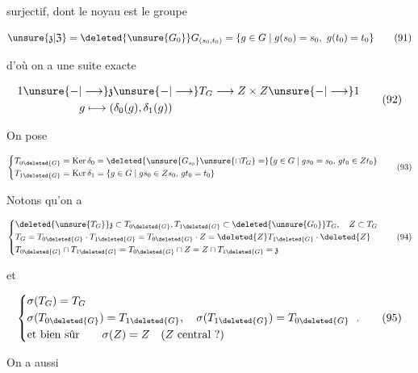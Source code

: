 
 surjectif, dont le noyau est le groupe

\[
\unsure{\mathfrak{z}|\mathfrak{Z}}=\deleted{\unsure{G_0}}G_{(s_0,t_0)}=\{g\in G\mid g(s_0)=s_0,\ g(t_0)=t_0\}\tag*{(91)}
\]


d'où on a une suite exacte

\[\begin{aligned}
1&\unsure{-|\longrightarrow}\mathfrak{z}\unsure{-|\longrightarrow}T_G\longrightarrow Z\times Z\unsure{-|\longrightarrow}1\\
&\hspace{5em}g\longmapsto(\delta_0(g),\delta_1(g))
\end{aligned}\tag*{(92)}\]

On pose

\[
\left\{\begin{aligned}
T_{0\deleted{G}}&=\operatorname{Ker}\delta_0=\deleted{\unsure{G_{s_0}}\unsure{\cap T_G}=}\{g\in G\mid gs_0=s_0,\,gt_0\in Zt_0\}\\
T_{1\deleted{G}}&=\operatorname{Ker}\delta_1=\{g\in G\mid gs_0\in Zs_0,\,gt_0=t_0\}
\end{aligned}\right.\tag*{(93)}
\]

Notons qu'on a

\[
\left\{\begin{aligned}
&\deleted{\unsure{T_G}}\mathfrak{z}\subset T_{0\deleted{G}},T_{1\deleted{G}}\subset\deleted{\unsure{G_0}}T_G,\quad Z\subset T_G\\
&T_G=T_{0\deleted{G}}\cdot T_{1\deleted{G}}=T_{0\deleted{G}}\cdot Z=\deleted{Z}T_{1\deleted{G}}\cdot\deleted{Z}\\
&T_{0\deleted{G}}\cap T_{1\deleted{G}}=T_{0\deleted{G}}\cap Z=Z\cap T_{1\deleted{G}}=\mathfrak{z}
\end{aligned}\right.\tag*{(94)}
\]

et

\[
\left\{\begin{aligned}
&\sigma(T_G)=T_G\\
&\sigma(T_{0\deleted{G}})=T_{1\deleted{G}},\quad \sigma(T_{1\deleted{G}})=T_{0\deleted{G}}\\
&\text{et bien sûr}\qquad \sigma(Z)=Z\quad (Z\text{ central }?)
\end{aligned}\right.\ .\tag*{(95)}
\]

On a aussi

